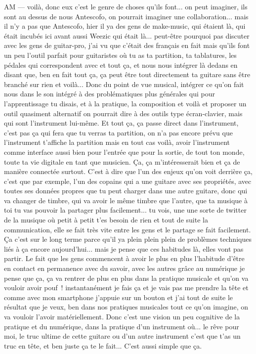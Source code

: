 AM — voilà, donc eux c'est le genre de choses qu'ils font... on peut imaginer, ils sont au dessus de nous Antescofo, on pourrait imaginer une collaboration... mais il n'y a pas que Antescofo, hier il ya des gens de make-music, qui étaient là, qui était incubés ici avant aussi Weezic qui était là... peut-être pourquoi pas discuter avec les gens de guitar-pro, j'ai vu que c'était des français en fait mais qu'ils font un peu l'outil parfait pour guitaristes où tu as ta partition, ta tablatures, les pédales qui correspondent avec et tout ça, et nous nous intégrer là dedans en disant que, ben en fait tout ça, ça peut être tout directement ta guitare sans être branché sur rien et voilà... Donc du point de vue musical, intégrer ce qu'on fait nous dans le son intégré à des problématiques plus générales qui pour l'apprentissage tu disais, et à la pratique, la composition et voilà et proposer un outil quasiment alternatif on pourrait dire à des outils type écran-clavier, mais qui sont l'instrument lui-même. Et tout ça, ça passe direct dans l'instrument, c'est pas ça qui fera que tu verras ta partition, on n'a pas encore prévu que l'instrument t'affiche la partition mais en tout cas voilà, avoir l'instrument comme interface aussi bien pour l'entrée que pour la sortie, de tout ton monde, toute ta vie digitale en tant que musicien. Ça, ça m'intéresserait bien et ça de manière connectée surtout. 
C'est à dire que l'un des enjeux qu'on voit derrière ça, c'est que par exemple, l'un des copains qui a une guitare avec ses propriétés, avec toutes ses données propres que tu peut charger dans une autre guitare, donc qui va changer de timbre, qui va avoir le même timbre que l'autre, que ta musique à toi tu vas pouvoir la partager plus facilement... tu vois, une une sorte de twitter de la musique où petit à petit t'es besoin de rien et tout de suite la communication, elle se fait très vite entre les gens et le partage se fait facilement. Ça c'est sur le long terme parce qu'il ya plein plein plein de problèmes techniques liés à ça encore aujourd'hui... mais je pense que ces habitudes là, elles vont pas partir. Le fait que les gens commencent à avoir le plus en plus l'habitude d'être en contact en permanence avec du savoir, avec les autres grâce au numérique je pense que ça, ça va rentrer de plus en plus dans la pratique musicale et qu'on va vouloir avoir pouf ! instantanément je fais ça et je vais pas me prendre la tête et comme avec mon smartphone j'appuie sur un bouton et j'ai tout de suite le résultat que je veux, ben dans nos pratiques musicales tout ce qu'on imagine, on va vouloir l'avoir matériellement. Donc c'est une vision un peu cognitive de la pratique et du numérique, dans la pratique d'un instrument où... le rêve pour moi, le truc ultime de cette guitare ou d'un autre instrument c'est que t'as un truc en tête, et ben juste ça te le fait... C'est aussi simple que ça. 
